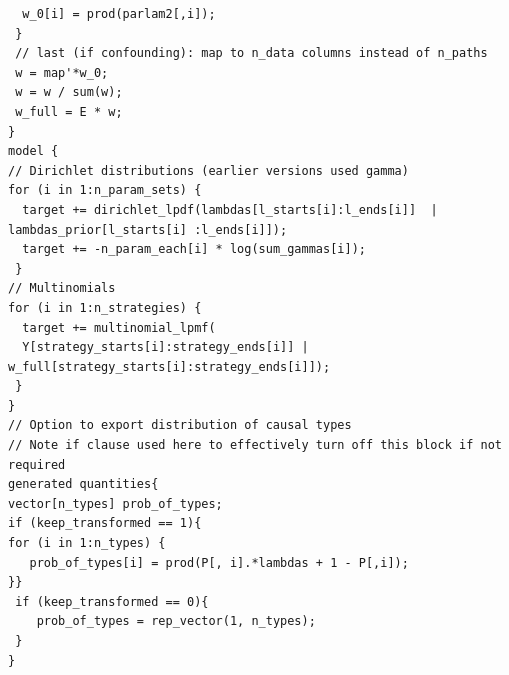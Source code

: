 \documentclass[
  article]{jss}
\begin{document}
\begin{verbatim}
  w_0[i] = prod(parlam2[,i]);
 }
 // last (if confounding): map to n_data columns instead of n_paths
 w = map'*w_0;
 w = w / sum(w);
 w_full = E * w;
}
model {
// Dirichlet distributions (earlier versions used gamma)
for (i in 1:n_param_sets) {
  target += dirichlet_lpdf(lambdas[l_starts[i]:l_ends[i]]  | lambdas_prior[l_starts[i] :l_ends[i]]);
  target += -n_param_each[i] * log(sum_gammas[i]);
 }
// Multinomials
for (i in 1:n_strategies) {
  target += multinomial_lpmf(
  Y[strategy_starts[i]:strategy_ends[i]] | w_full[strategy_starts[i]:strategy_ends[i]]);
 }
}
// Option to export distribution of causal types
// Note if clause used here to effectively turn off this block if not required
generated quantities{
vector[n_types] prob_of_types;
if (keep_transformed == 1){
for (i in 1:n_types) {
   prob_of_types[i] = prod(P[, i].*lambdas + 1 - P[,i]);
}}
 if (keep_transformed == 0){
    prob_of_types = rep_vector(1, n_types);
 }
}
\end{verbatim}
\end{document}

